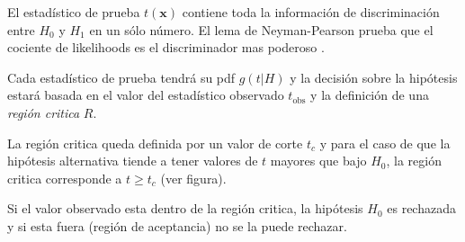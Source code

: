 El estadístico de prueba $t(\bm{x})$ contiene toda la información de
discriminación entre $H_0$ y $H_1$ en un s\'olo número. El lema de
Neyman-Pearson prueba que el cociente de likelihoods es el
discriminador mas poderoso . %

Cada estadístico de prueba tendrá su pdf $g(t|H)$ y la decisión sobre la
hipótesis estará basada en el valor del estadístico observado $t_\text{obs}$ y
la definición de una \emph{región critica} $R$.

La región critica queda definida por un valor de corte $t_c$ y para el caso de
que la hipótesis alternativa tiende a tener valores de $t$ mayores que bajo
$H_0$, la región critica corresponde a $t \geq t_c$ (ver figura).

Si el valor observado esta dentro de la región critica, la hipótesis $H_0$ es
rechazada y si esta fuera (región de aceptancia) no se la puede rechazar.

\begin{figure}[h]
  \centering 
\end{figure}





